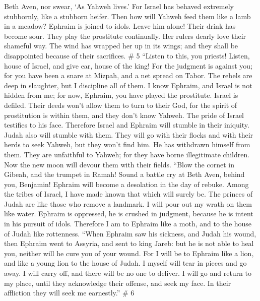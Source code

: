 Beth Aven, nor swear, `As Yahweh lives.'  For Israel has
behaved extremely stubbornly, like a stubborn heifer. Then how will
Yahweh feed them like a lamb in a meadow?  Ephraim is
joined to idols. Leave him alone!  Their drink has become
sour. They play the prostitute continually. Her rulers dearly love their
shameful way.  The wind has wrapped her up in its wings;
and they shall be disappointed because of their sacrifices. \# 5
 ``Listen to this, you priests! Listen, house of Israel, and
give ear, house of the king! For the judgment is against you; for you
have been a snare at Mizpah, and a net spread on Tabor.  The
rebels are deep in slaughter, but I discipline all of them. 
I know Ephraim, and Israel is not hidden from me; for now, Ephraim, you
have played the prostitute. Israel is defiled.  Their deeds
won't allow them to turn to their God, for the spirit of prostitution is
within them, and they don't know Yahweh.  The pride of
Israel testifies to his face. Therefore Israel and Ephraim will stumble
in their iniquity. Judah also will stumble with them.  They
will go with their flocks and with their herds to seek Yahweh, but they
won't find him. He has withdrawn himself from them.  They
are unfaithful to Yahweh; for they have borne illegitimate children. Now
the new moon will devour them with their fields.  ``Blow the
cornet in Gibeah, and the trumpet in Ramah! Sound a battle cry at Beth
Aven, behind you, Benjamin!  Ephraim will become a
desolation in the day of rebuke. Among the tribes of Israel, I have made
known that which will surely be.  The princes of Judah are
like those who remove a landmark. I will pour out my wrath on them like
water.  Ephraim is oppressed, he is crushed in judgment,
because he is intent in his pursuit of idols.  Therefore I
am to Ephraim like a moth, and to the house of Judah like rottenness.
 ``When Ephraim saw his sickness, and Judah his wound, then
Ephraim went to Assyria, and sent to king Jareb: but he is not able to
heal you, neither will he cure you of your wound.  For I
will be to Ephraim like a lion, and like a young lion to the house of
Judah. I myself will tear in pieces and go away. I will carry off, and
there will be no one to deliver.  I will go and return to
my place, until they acknowledge their offense, and seek my face. In
their affliction they will seek me earnestly.'' \# 6 
